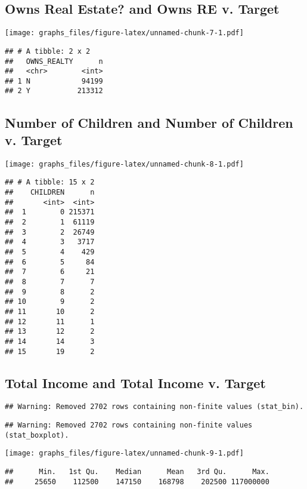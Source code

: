 \documentclass[]{article}
\begin{document}
\subsection{Owns Real Estate? and Owns RE v.
Target}\label{owns-real-estate-and-owns-re-v.-target}

\texttt{[image: graphs\_files/figure-latex/unnamed-chunk-7-1.pdf]}

\begin{verbatim}
## # A tibble: 2 x 2
##   OWNS_REALTY      n
##   <chr>        <int>
## 1 N            94199
## 2 Y           213312
\end{verbatim}

\subsection{Number of Children and Number of Children v.
Target}\label{number-of-children-and-number-of-children-v.-target}

\texttt{[image: graphs\_files/figure-latex/unnamed-chunk-8-1.pdf]}

\begin{verbatim}
## # A tibble: 15 x 2
##    CHILDREN      n
##       <int>  <int>
##  1        0 215371
##  2        1  61119
##  3        2  26749
##  4        3   3717
##  5        4    429
##  6        5     84
##  7        6     21
##  8        7      7
##  9        8      2
## 10        9      2
## 11       10      2
## 12       11      1
## 13       12      2
## 14       14      3
## 15       19      2
\end{verbatim}

\subsection{Total Income and Total Income v.
Target}\label{total-income-and-total-income-v.-target}

\begin{verbatim}
## Warning: Removed 2702 rows containing non-finite values (stat_bin).
\end{verbatim}

\begin{verbatim}
## Warning: Removed 2702 rows containing non-finite values (stat_boxplot).
\end{verbatim}

\texttt{[image: graphs\_files/figure-latex/unnamed-chunk-9-1.pdf]}

\begin{verbatim}
##      Min.   1st Qu.    Median      Mean   3rd Qu.      Max. 
##     25650    112500    147150    168798    202500 117000000
\end{verbatim}
\end{document}
